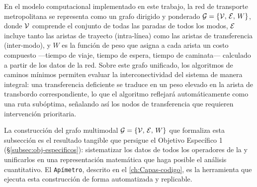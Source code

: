 En el modelo computacional implementado en este trabajo, la red de transporte
metropolitana se representa como un grafo dirigido y ponderado
$\mathcal{G} = \{\mathcal{V},\, \mathcal{E},\, W\}$, donde $\mathcal{V}$ comprende el conjunto de
todas las paradas de todos los modos, $\mathcal{E}$ incluye tanto las aristas de
trayecto (intra-línea) como las aristas de transferencia (inter-modo), y $W$ es
la función de peso que asigna a cada arista un costo compuesto ---tiempo de
viaje, tiempo de espera, tiempo de caminata--- calculado a partir de los datos
\gtfs{} de la red. Sobre este grafo unificado, los algoritmos de caminos mínimos
permiten evaluar la interconectividad del sistema de manera integral: una
transferencia deficiente se traduce en un peso elevado en la arista de
transbordo correspondiente, lo que el algoritmo reflejará automáticamente como
una ruta subóptima, señalando así los nodos de transferencia que requieren
intervención prioritaria.

La construcción del grafo multimodal $\mathcal{G} = \{\mathcal{V},\, \mathcal{E},\, W\}$ que
formaliza esta subsección es el resultado tangible que persigue el Objetivo
Específico 1 (§\ref{subsec:obj-especificos}): sistematizar los datos \gtfs{} de
todos los operadores de la \zmvm{} y unificarlos en una representación
matemática que haga posible el análisis cuantitativo. El \texttt{Apímetro}, descrito en
el \autoref{ch:Capas-codigo}, es la herramienta que ejecuta esta construcción de
forma automatizada y replicable.
